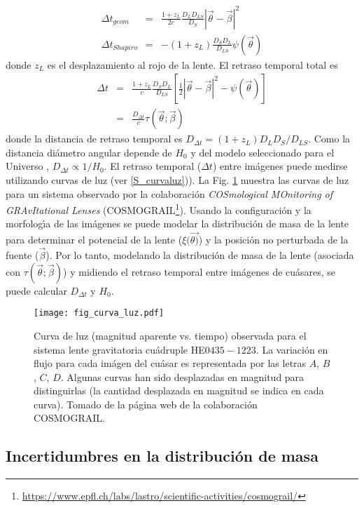 \documentclass[baaa]{baaa}
\begin{document}
\begin{eqnarray}
	\Delta t_{geom}  &=&  \frac{1+z_L}{2c} \frac{D_L D_{LS}}{D_S}  |\vec{\theta}-\vec{\beta}|^2 \\
	\Delta t_{Shapiro} & =&  -(1+z_L) \frac{D_S D_L}{D_{LS}} \psi(\vec{\theta})
\end{eqnarray}
donde $z_L$ es el desplazamiento al rojo de la lente. El retraso temporal total es
\begin{eqnarray}
\Delta t &= &\frac{1+z_L}{c}  \frac{D_S D_L}{D_{LS}} \left[ \frac{1}{2} |\vec{\theta}-\vec{\beta}|^2  - \psi(\vec{\theta}) \right] \\ 
&=& \frac{D_{\Delta t}}{c} \tau (\vec{\theta}; \vec{\beta})
\end{eqnarray}
donde la distancia de retraso temporal es  $D_{\Delta t}=(1+z_L) D_L D_{S}/D_{LS}$. Como la distancia di\'ametro angular depende de $H_0$ y del modelo seleccionado para el Universo \citep{hogg1999}, $D_{\Delta t} \propto 1/H_0$. El retraso temporal ($\Delta t$) entre im\'agenes puede medirse utilizando curvas de luz (ver \ref{S_curvaluz})). La Fig. \ref{fig2} muestra las curvas de luz para un sistema observado por la colaboraci\'on {\em COSmological MOnitoring of GRAvItational Lenses} (COSMOGRAIL\footnote{\url{https://www.epfl.ch/labs/lastro/scientific-activities/cosmograil/}}). 
Usando la configuración y la morfolog\'{\i}a de las im\'agenes se puede modelar la distribución de masa de la lente para determinar el potencial de la lente ($\xi(\vec{\theta)}$) y la posici\'on no perturbada de la fuente ($\vec{\beta}$).
Por lo tanto, modelando la distribuci\'on de masa de la lente (asociada con $ \tau (\vec{\theta}; \vec{\beta})$) y midiendo el retraso temporal entre im\'agenes de cu\'asares, se puede calcular  $D_{\Delta t}$ y $H_0$.


\begin{figure}[!t]
	\centering
	\texttt{[image: fig\_curva\_luz.pdf]}
	\caption{Curva de luz (magnitud aparente vs. tiempo) observada para el sistema lente gravitatoria cu\'adruple HE$0435-1223$. La variaci\'on en flujo para cada im\'agen del cu\'asar es representada por las letras $A$, $B$, $C$, $D$. Algunas curvas han sido desplazadas en magnitud para distinguirlas (la cantidad desplazada en magnitud se indica en cada curva).  Tomado de la p\'agina web de la colaboraci\'on COSMOGRAIL.  }
	\label{fig2}
\end{figure}

\subsection{Incertidumbres en la distribuci\'on de masa}
\end{document}
